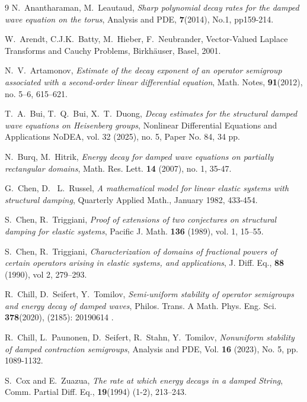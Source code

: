 \documentclass[11pt]{amsart}
\numberwithin{equation}{section}
\theoremstyle{remark}
\theoremstyle{definition}
\begin{document}
\begin{thebibliography}{9}
	 N.\ Anantharaman, M.\ Leautaud, \textit{Sharp polynomial decay rates for the damped wave equation on the torus}, Analysis and PDE, \textbf{7}(2014), No.1, pp159-214. 
	
	W.\ Arendt, C.J.K.\ Batty, M.\ Hieber, F.\ Neubrander,
	Vector-Valued Laplace Transforms and Cauchy Problems,
	Birkh\"{a}user, Basel, 2001.
	
	 N.\ V.\ Artamonov, \textit{Estimate of the decay exponent of an operator semigroup associated with a second-order linear differential equation}, Math. Notes, \textbf{91}(2012), no. 5--6, 615--621.
	
	 T.\ A.\ Bui, T.\ Q.\ Bui, X.\ T.\ Duong,  \textit{Decay estimates for the structural damped wave equations on Heisenberg groups}, Nonlinear Differential Equations and Applications NoDEA, vol. 32 (2025), no. 5, Paper No. 84, 34 pp.
	
	 N.\ Burq, M.\ Hitrik, \textit{Energy decay for damped wave equations on partially rectangular domains}, Math. Res. Lett. \textbf{14} (2007), no. 1, 35-47.
	
	 G.\ Chen, D. \ L.\ Russel, \textit{A mathematical model for linear elastic systems with structural damping}, Quarterly Applied Math., January 1982, 433-454.
	
	 S.\ Chen, R.\ Triggiani, \textit{Proof of extensions of two conjectures on structural damping for elastic systems}, Pacific J. Math. \textbf{136} (1989), vol. 1, 15--55.
	
	  S.\ Chen, R.\ Triggiani, \textit{Characterization of domains of fractional powers of certain operators arising in elastic systems, and applications}, J. Diff. Eq., \textbf{88} (1990), vol 2, 279--293.  
	
	 R.\ Chill, D.\ Seifert, Y.\ Tomilov, \textit{Semi-uniform stability of operator semigroups and energy decay of damped waves}, Philos. Trans. A Math. Phys. Eng. Sci. \textbf{378}(2020),  (2185): 20190614 .
	
	 R.\ Chill, L.\ Paunonen, D.\ Seifert, R.\ Stahn, Y.\ Tomilov, \textit{Nonuniform stability of damped contraction semigroups}, Analysis and PDE, Vol. \textbf{16} (2023), No. 5, pp. 1089-1132.
	
	 S.\ Cox and E.\ Zuazua, \textit{The rate at which energy decays in a damped String}, Comm. Partial Diff. Eq., \textbf{19}(1994) (1-2), 213--243.
	

\end{thebibliography}
\end{document}
